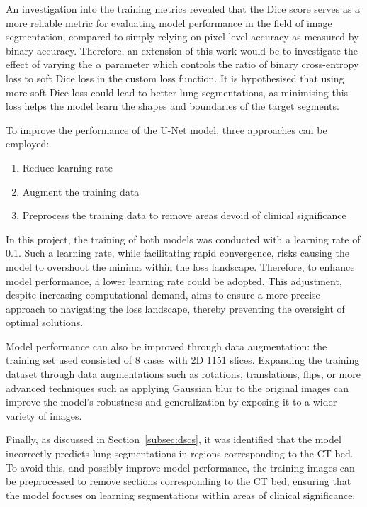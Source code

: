 \documentclass[12pt]{report}
\begin{document}
An investigation into the training metrics revealed that the Dice score serves as a more reliable metric for evaluating model performance in the field of image segmentation, compared to simply relying on pixel-level accuracy as measured by binary accuracy. Therefore, an extension of this work would be to investigate the effect of varying the $\alpha$ parameter which controls the ratio of binary cross-entropy loss to soft Dice loss in the custom loss function. It is hypothesised that using more soft Dice loss could lead to better lung segmentations, as minimising this loss helps the model learn the shapes and boundaries of the target segments.

To improve the performance of the U-Net model, three approaches can be employed:

\begin{enumerate}
    \item Reduce learning rate
    \item Augment the training data
    \item Preprocess the training data to remove areas devoid of clinical significance
\end{enumerate}

In this project, the training of both models was conducted with a learning rate of 0.1. Such a learning rate, while facilitating rapid convergence, risks causing the model to overshoot the minima within the loss landscape. Therefore, to enhance model performance, a lower learning rate could be adopted. This adjustment, despite increasing computational demand, aims to ensure a more precise approach to navigating the loss landscape, thereby preventing the oversight of optimal solutions.

Model performance can also be improved through data augmentation: the training set used consisted of 8 cases with 2D 1151 slices. Expanding the training dataset through data augmentations such as rotations, translations, flips, or more advanced techniques such as applying Gaussian blur to the original images\cite{alam_image_2021} can improve the model's robustness and generalization by exposing it to a wider variety of images.

Finally, as discussed in Section~\ref{subsec:dscs}, it was identified that the model incorrectly predicts lung segmentations in regions corresponding to the CT bed. To avoid this, and possibly improve model performance, the training images can be preprocessed to remove sections corresponding to the CT bed, ensuring that the model focuses on learning segmentations within areas of clinical significance.
\end{document}
